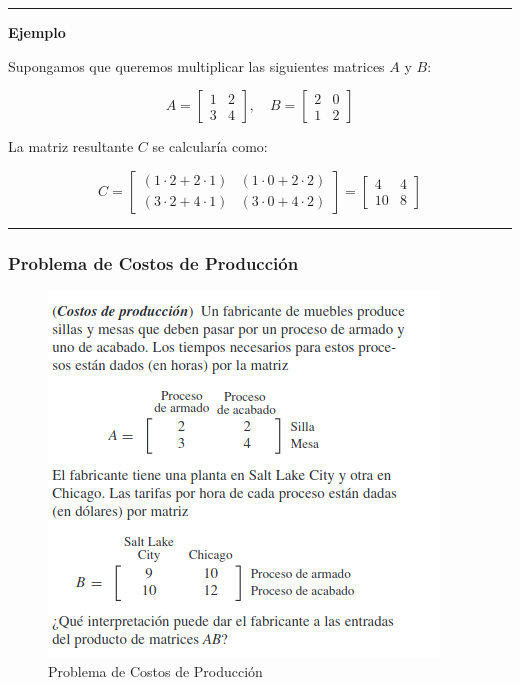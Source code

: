 \documentclass[
  letterpaper,
  DIV=11,
  numbers=noendperiod]{scrartcl}
\begin{document}
\begin{center}\rule{0.5\linewidth}{0.5pt}\end{center}

\textbf{Ejemplo}

Supongamos que queremos multiplicar las siguientes matrices \(A\) y
\(B\):

\[
A = \begin{bmatrix}
1 & 2 \\
3 & 4
\end{bmatrix}, \quad B = \begin{bmatrix}
2 & 0 \\
1 & 2
\end{bmatrix}
\]

La matriz resultante \(C\) se calcularía como:

\[
C = \begin{bmatrix}
(1 \cdot 2 + 2 \cdot 1) & (1 \cdot 0 + 2 \cdot 2) \\
(3 \cdot 2 + 4 \cdot 1) & (3 \cdot 0 + 4 \cdot 2)
\end{bmatrix} = \begin{bmatrix}
4 & 4 \\
10 & 8
\end{bmatrix}
\]

\begin{center}\rule{0.5\linewidth}{0.5pt}\end{center}

\subsubsection{Problema de Costos de
Producción}\label{problema-de-costos-de-producciuxf3n}

\begin{figure}[H]

{\centering \includegraphics{figures/produccion.png}

}

\caption{Problema de Costos de Producción}

\end{figure}%
\end{document}
